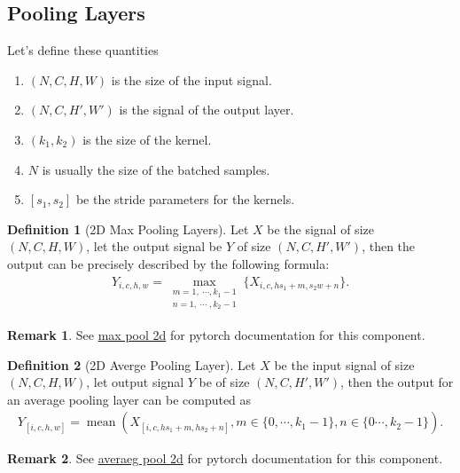 \documentclass[]{article}
\theoremstyle{definition}
\newtheorem{definition}{Definition}
\newtheorem{remark}{Remark}[subsection]
{
    \newtheorem{assumption}{Assumption}
}
\numberwithin{equation}{subsection}
\begin{document}
    \subsection{Pooling Layers}
        Let's define these quantities 
        \begin{enumerate}
            \item $(N, C, H, W)$ is the size of the input signal. 
            \item $(N, C, H', W')$ is the signal of the output layer.
            \item $(k_1, k_2)$ is the size of the kernel. 
            \item $N$ is usually the size of the batched samples. 
            \item $[s_1, s_2]$ be the stride parameters for the kernels. 
        \end{enumerate}
            
        \begin{definition}[2D Max Pooling Layers]
            Let $X$ be the signal of size $(N,C, H, W)$, let the output signal be $Y$ of size $(N, C, H', W')$, then the output can be precisely described by the following formula: 
            {
            \large
            \[
                \begin{aligned}
                    Y_{i,c, h, w} = 
                    \max_{
                        \substack{m = 1, \;\cdots, k_1 - 1\\n = 1, \; \cdots \; , k_2-1}
                    }
                    \{
                        X_{i, c, hs_1 + m, s_2w + n}
                    \}. 
                \end{aligned} 
            \]
            }
        \end{definition}
        \begin{remark}
            See \href{https://pytorch.org/docs/stable/generated/torch.nn.MaxPool2d.html}{max pool 2d} for pytorch documentation for this component. 
        \end{remark}

        \begin{definition}[2D Averge Pooling Layer]
            Let $X$ be the input signal of size $(N, C, H, W)$, let output signal $Y$ be of size $(N, C, H', W')$, then the output for an average pooling layer can be computed as
            {\large
            \begin{align*}
                Y_{[i, c, h, w]} = 
                \operatorname{mean} \left(
                    X_{[i, c, hs_1 + m, hs_2 + n]}, m \in \{ 0, \cdots, k_1 -1\}, n \in \{0 \cdots, k_2 -1\}
                \right). 
            \end{align*}
            }
        \end{definition}
        \begin{remark}
            See \href{https://pytorch.org/docs/stable/generated/torch.nn.AvgPool2d.html}{averaeg pool 2d} for pytorch documentation for this component. 
        \end{remark}
    
\end{document}
